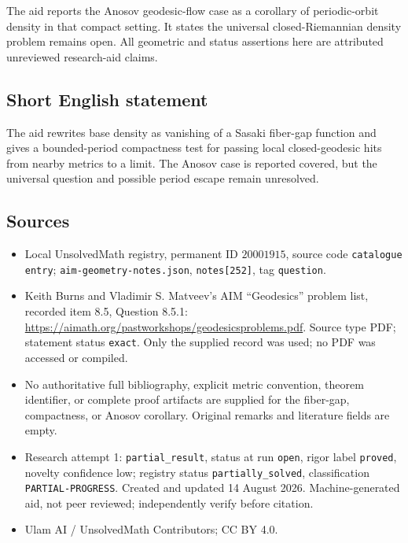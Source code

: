 \documentclass[11pt]{article}
\begin{document}
The aid reports the Anosov geodesic-flow case as a corollary of periodic-orbit density in that compact setting. It states the universal closed-Riemannian density problem remains open. All geometric and status assertions here are attributed unreviewed research-aid claims.
\subsection{Short English statement}
The aid rewrites base density as vanishing of a Sasaki fiber-gap function and gives a bounded-period compactness test for passing local closed-geodesic hits from nearby metrics to a limit. The Anosov case is reported covered, but the universal question and possible period escape remain unresolved.
\subsection{Sources}
\begin{itemize}
\item Local UnsolvedMath registry, permanent ID \(20001915\), source code \texttt{catalogue entry}; \texttt{aim-geometry-notes.json}, \texttt{notes[252]}, tag \texttt{question}.
\item Keith Burns and Vladimir S. Matveev's AIM ``Geodesics'' problem list, recorded item 8.5, Question 8.5.1: \url{https://aimath.org/pastworkshops/geodesicsproblems.pdf}. Source type PDF; statement status \texttt{exact}. Only the supplied record was used; no PDF was accessed or compiled.
\item No authoritative full bibliography, explicit metric convention, theorem identifier, or complete proof artifacts are supplied for the fiber-gap, compactness, or Anosov corollary. Original remarks and literature fields are empty.
\item Research attempt 1: \texttt{partial\_result}, status at run \texttt{open}, rigor label \texttt{proved}, novelty confidence low; registry status \texttt{partially\_solved}, classification \texttt{PARTIAL-PROGRESS}. Created and updated 14 August 2026. Machine-generated aid, not peer reviewed; independently verify before citation.
\item Ulam AI / UnsolvedMath Contributors; CC BY 4.0.
\end{itemize}
\end{document}
